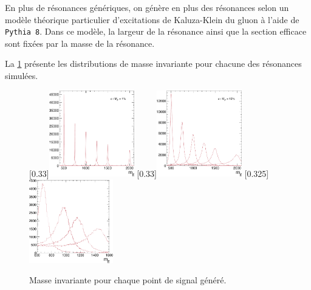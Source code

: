 \smallskip

En plus de résonances \zprime génériques, on génère en plus des résonances selon un modèle théorique particulier d'excitations de Kaluza-Klein du gluon à l'aide de \texttt{Pythia 8}. Dans ce modèle, la largeur de la résonance ainsi que la section efficace sont fixées par la masse de la résonance.

\medskip

La \cref{fig:mtt_gen} présente les distributions de masse invariante \ttbar pour chacune des résonances simulées.

\begin{figure}[tbp] \centering
    [0.33\textwidth]{\includegraphics[width=0.33\textwidth]{chapitre7/figs/mtt_zprime_narrow_gen.pdf}}
    [0.33\textwidth]{\includegraphics[width=0.33\textwidth]{chapitre7/figs/mtt_zprime_large_gen.pdf}}
    \subcaptionbox{\kkglu}[0.325\textwidth]{\includegraphics[width=0.325\textwidth]{chapitre7/figs/mtt_rsgluons_gen.pdf}}
    \caption{Masse invariante \ttbar pour chaque point de signal généré.}
    \label{fig:mtt_gen}
\end{figure}

